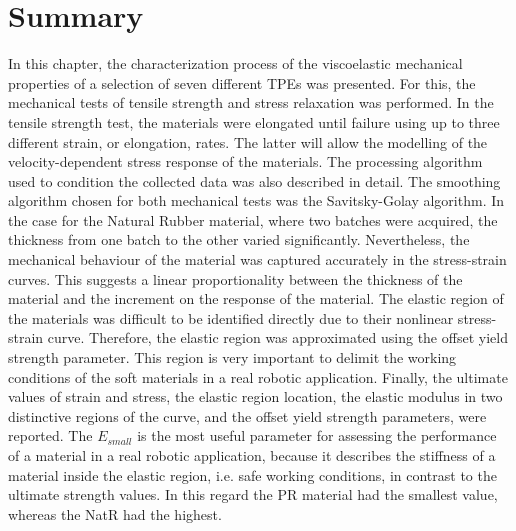 



\section{Summary}

In this chapter, the characterization process of the viscoelastic mechanical properties of a selection of seven different TPEs was presented. For this, the mechanical tests of tensile strength and stress relaxation was performed. In the tensile strength test, the materials were elongated until failure using up to three different strain, or elongation, rates. The latter will allow the modelling of the velocity-dependent stress response of the materials. The processing algorithm used to condition the collected data was also described in detail. The smoothing algorithm chosen for both mechanical tests was the Savitsky-Golay algorithm. In the case for the Natural Rubber material, where two batches were acquired, the thickness from one batch to the other varied significantly. Nevertheless, the mechanical behaviour of the material was captured accurately in the stress-strain curves. This suggests a linear proportionality between the thickness of the material and the increment on the response of the material. The elastic region of the materials was difficult to be identified directly due to their nonlinear stress-strain curve. Therefore, the elastic region was approximated using the offset yield strength parameter. This region is very important to delimit the working conditions of the soft materials in a real robotic application. Finally, the ultimate values of strain and stress, the elastic region location, the elastic modulus in two distinctive regions of the curve, and the offset yield strength parameters, were reported. The $E_{small}$ is the most useful parameter for assessing the performance of a material in a real robotic application, because it describes the stiffness of a material inside the elastic region, i.e. safe working conditions, in contrast to the ultimate strength values. In this regard the PR material had the smallest value, whereas the NatR had the highest.

